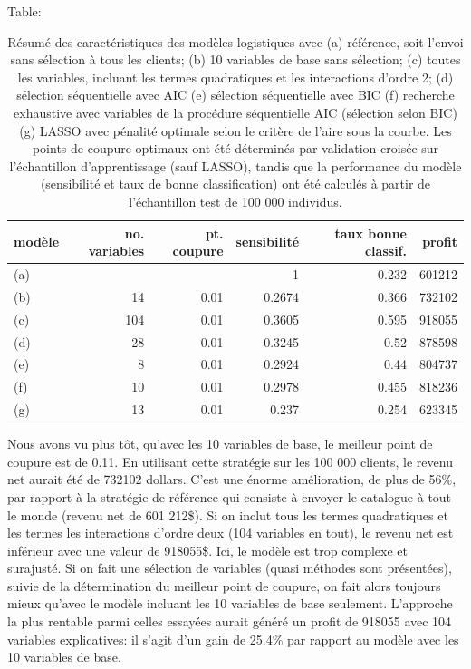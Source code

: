 \documentclass[
  11pt,
  letterpaper,
]{book}
\theoremstyle{definition}
\theoremstyle{remark}
\begin{document}
Table:

\hypertarget{tbl-03-summarylog}{}
\begin{table}
\caption{\label{tbl-03-summarylog}Résumé des caractéristiques des modèles logistiques avec (a) référence,
soit l'envoi sans sélection à tous les clients; (b) 10 variables de base
sans sélection; (c) toutes les variables, incluant les termes
quadratiques et les interactions d'ordre 2; (d) sélection séquentielle
avec AIC (e) sélection séquentielle avec BIC (f) recherche exhaustive
avec variables de la procédure séquentielle AIC (sélection selon BIC)
(g) LASSO avec pénalité optimale selon le critère de l'aire sous la
courbe. Les points de coupure optimaux ont été déterminés par
validation-croisée sur l'échantillon d'apprentissage (sauf LASSO),
tandis que la performance du modèle (sensibilité et taux de bonne
classification) ont été calculés à partir de l'échantillon test de 100
000 individus. }\tabularnewline

\centering
\begin{tabular}{lrrrrr}
\toprule
modèle & no. variables & pt. coupure &  sensibilité & taux bonne classif. & profit\\
\midrule
(a) &  &  & 1 & 0.232 & 601212\\
(b) & 14 & 0.01 & 0.2674 & 0.366 & 732102\\
(c) & 104 & 0.01 & 0.3605 & 0.595 & 918055\\
(d) & 28 & 0.01 & 0.3245 & 0.52 & 878598\\
(e) & 8 & 0.01 & 0.2924 & 0.44 & 804737\\
\addlinespace
(f) & 10 & 0.01 & 0.2978 & 0.455 & 818236\\
(g) & 13 & 0.01 & 0.237 & 0.254 & 623345\\
\bottomrule
\end{tabular}
\end{table}

Nous avons vu plus tôt, qu'avec les 10 variables de base, le meilleur
point de coupure est de 0.11. En utilisant cette stratégie sur les 100
000 clients, le revenu net aurait été de 732102 dollars. C'est une
énorme amélioration, de plus de 56\%, par rapport à la stratégie de
référence qui consiste à envoyer le catalogue à tout le monde (revenu
net de 601 212\$). Si on inclut tous les termes quadratiques et les
termes les interactions d'ordre deux (104 variables en tout), le revenu
net est inférieur avec une valeur de 918055\$. Ici, le modèle est trop
complexe et surajusté. Si on fait une sélection de variables (quasi
méthodes sont présentées), suivie de la détermination du meilleur point
de coupure, on fait alors toujours mieux qu'avec le modèle incluant les
10 variables de base seulement. L'approche la plus rentable parmi celles
essayées aurait généré un profit de 918055 avec 104 variables
explicatives: il s'agit d'un gain de 25.4\% par rapport au modèle avec
les 10 variables de base.
\end{document}
